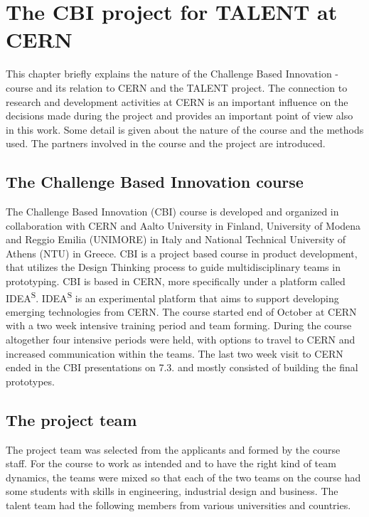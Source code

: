\documentclass[english,12pt,a4paper,dvips]{article}
\begin{document}
\section{The CBI project for TALENT at CERN}

This chapter briefly explains the nature of the Challenge Based Innovation -course and its relation to CERN and the TALENT project. The connection to research and development activities at CERN is an important influence on the decisions made during the project and provides an important point of view also in this work. Some detail is given about the nature of the course and the methods used. The partners involved in the course and the project are introduced. 


\subsection{The Challenge Based Innovation course}

The Challenge Based Innovation (CBI) course is developed and organized in collaboration with CERN and Aalto University in Finland, University of Modena and Reggio Emilia (UNIMORE) in Italy and National Technical University of Athens (NTU) in Greece. CBI is a project based course in product development, that utilizes the Design Thinking process to guide multidisciplinary teams in prototyping. CBI is based in CERN, more specifically under a platform called IDEA\textsuperscript{S}. IDEA\textsuperscript{S} is an experimental platform that aims to support developing emerging technologies from CERN. The course started end of October at CERN with a two week intensive training period and team forming. During the course altogether four intensive periods were held, with options to travel to CERN and increased communication within the teams. The last two week visit to CERN ended in the CBI presentations on 7.3. and mostly consisted of building the final prototypes.

\subsection{The project team}

The project team was selected from the applicants and formed by the course staff. For the course to work as intended and to have the right kind of team dynamics, the teams were mixed so that each of the two teams on the course had some students with skills in engineering, industrial design and business. The talent team had the following members from various universities and countries.
\end{document}
